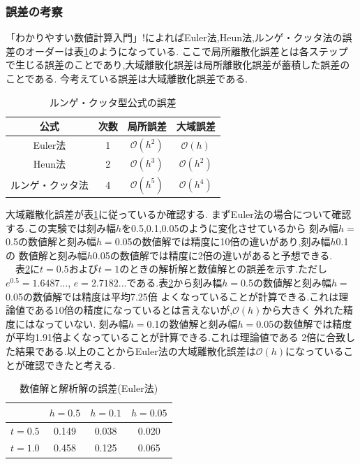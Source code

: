 \documentclass[dvipdfmx]{jarticle}
\begin{document}
    \subsubsection{誤差の考察}
    「わかりやすい数値計算入門」!によればEuler法,Heun法,ルンゲ・クッタ法の誤差のオーダーは表\ref{rkgosa}のようになっている.
    ここで局所離散化誤差とは各ステップで生じる誤差のことであり,大域離散化誤差は局所離散化誤差が蓄積した誤差のことである.
    今考えている誤差は大域離散化誤差である.
    \begin{table}[H]
      \caption{ルンゲ・クッタ型公式の誤差}
    \label{rkgosa}
    \begin{center}
        \begin{tabular}{c|c|c|c}\hline
          公式 & 次数 & 局所誤差 & 大域誤差 \\ \hline \hline
          Euler法 & 1 & $\mathcal{O}(h^2)$ & $\mathcal{O}(h)$ \\ 
          Heun法 & 2 & $\mathcal{O}(h^3)$ & $\mathcal{O}(h^2)$ \\
          ルンゲ・クッタ法 & 4 & $\mathcal{O}(h^5)$ & $\mathcal{O}(h^4)$ \\ \hline
        \end{tabular}
    \end{center}
    \end{table}
    
    大域離散化誤差が表\ref{rkgosa}に従っているか確認する.
    まずEuler法の場合について確認する.この実験では刻み幅$h$を0.5,0.1,0.05のように変化させているから
    刻み幅$h=$0.5の数値解と刻み幅$h=$0.05の数値解では精度に10倍の違いがあり,刻み幅$h$0.1の
    数値解と刻み幅$h$0.05の数値解では精度に2倍の違いがあると予想できる.\\
    　表\ref{eulergosa}に$t=0.5$および$t=1$のときの解析解と数値解との誤差を示す.ただし$e^{0.5}=1.6487...$,
    $e=2.7182...$である.表\ref{eulergosa}から刻み幅$h=$0.5の数値解と刻み幅$h=$0.05の数値解では精度は平均7.25倍
    よくなっていることが計算できる.これは理論値である10倍の精度になっているとは言えないが,$\mathcal{O}(h)$から大きく
    外れた精度にはなっていない.
    刻み幅$h=$0.1の数値解と刻み幅$h=$0.05の数値解では精度が平均1.91倍よくなっていることが計算できる.これは理論値である
    2倍に合致した結果である.以上のことからEuler法の大域離散化誤差は$\mathcal{O}(h)$になっていることが確認できたと考える.

    \begin{table}[H]
      \caption{数値解と解析解の誤差(Euler法)}
    \label{eulergosa}
    \begin{center}
        \begin{tabular}{c|c|c|c}\hline 
          & $h=0.5$ & $h=0.1$ & $h=0.05$ \\ \hline \hline 
          $t=0.5$ & 0.149 & 0.038 & 0.020 \\ 
          $t=1.0$ & 0.458 & 0.125 & 0.065 \\ \hline
        \end{tabular}
    \end{center}
    \end{table}    
\end{document}
